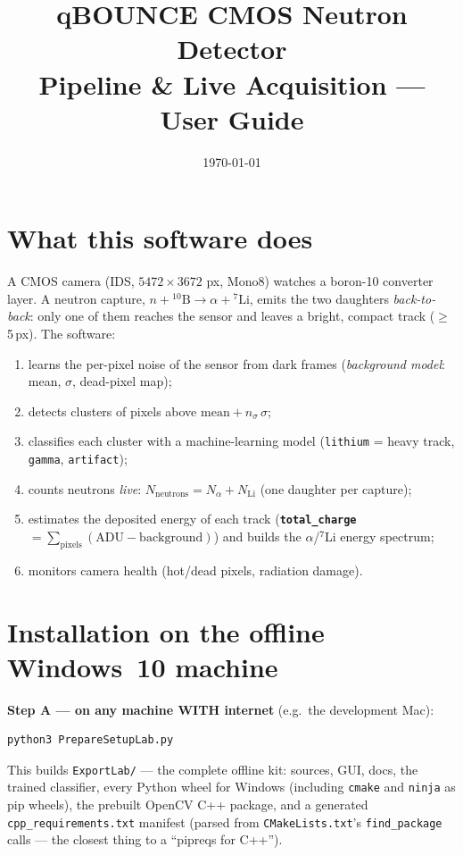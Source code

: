 \documentclass[11pt,a4paper]{article}
\title{qBOUNCE CMOS Neutron Detector\\\large Pipeline \& Live Acquisition --- User Guide}
\author{}
\date{\today}
\newcommand{\param}[1]{\texttt{\textbf{#1}}}
\begin{document}
\maketitle
\tableofcontents

\section{What this software does}
A CMOS camera (IDS, $5472\times3672$ px, Mono8) watches a boron-10 converter
layer. A neutron capture, $n + {}^{10}\mathrm{B} \rightarrow \alpha +
{}^{7}\mathrm{Li}$, emits the two daughters \emph{back-to-back}: only one of
them reaches the sensor and leaves a bright, compact track ($\geq$ 5\,px).
The software:
\begin{enumerate}
  \item learns the per-pixel noise of the sensor from dark frames
        (\emph{background model}: mean, $\sigma$, dead-pixel map);
  \item detects clusters of pixels above $\mathrm{mean} + n_\sigma\,\sigma$;
  \item classifies each cluster with a machine-learning model
        (\texttt{lithium} = heavy track, \texttt{gamma}, \texttt{artifact});
  \item counts neutrons \emph{live}: $N_{\mathrm{neutrons}} =
        N_{\alpha} + N_{\mathrm{Li}}$ (one daughter per capture);
  \item estimates the deposited energy of each track
        (\param{total\_charge} $= \sum_{\mathrm{pixels}}(\mathrm{ADU} -
        \mathrm{background})$) and builds the $\alpha$/$^{7}$Li energy
        spectrum;
  \item monitors camera health (hot/dead pixels, radiation damage).
\end{enumerate}

\section{Installation on the offline Windows~10 machine}
\textbf{Step A — on any machine WITH internet} (e.g.\ the development Mac):
\begin{verbatim}
python3 PrepareSetupLab.py
\end{verbatim}
This builds \texttt{ExportLab/} — the complete offline kit: sources, GUI,
docs, the trained classifier, every Python wheel for Windows (including
\texttt{cmake} and \texttt{ninja} as pip wheels), the prebuilt OpenCV C++
package, and a generated \texttt{cpp\_requirements.txt} manifest (parsed from
\texttt{CMakeLists.txt}'s \texttt{find\_package} calls --- the closest thing
to a ``pipreqs for C++'').
\end{document}
